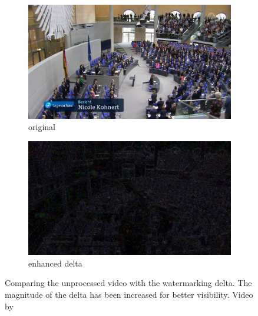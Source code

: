 \documentclass[12pt, technote]{IEEEtran}
\begin{document}
\begin{figure}[t]
    \centering
    \begin{subfigure}[b]{0.48\textwidth}
        \centering
        \includegraphics[width=\textwidth]{imgs/original.png}
        \caption{original}
        \label{fig:diff1}
    \end{subfigure}
    \begin{subfigure}[b]{0.48\textwidth}
        \centering
        \includegraphics[width=\textwidth]{imgs/diff.jpg}
        \caption{enhanced delta}
        \label{fig:diff2}
    \end{subfigure}
    \hfill
    \caption{Comparing the unprocessed video with the watermarking delta. The magnitude of the delta has been increased for better visibility. Video by\cite{archiveTagesschauUhr}}
    \label{fig:diff}
\end{figure}
\end{document}
